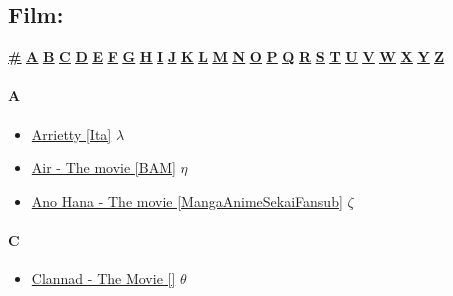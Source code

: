 \subsection [Film]{\huge Film:}
		\begin{center}
			\hyperlink{F\#}{\textbf{\underline{\#}}}
			\hyperlink{FA}{\textbf{\underline{A}}} \hyperlink{FB}{\textbf{\underline{B}}} \hyperlink{FC}{\textbf{\underline{C}}} \hyperlink{FD}{\textbf{\underline{D}}} \hyperlink{FE}{\textbf{\underline{E}}} \hyperlink{FF}{\textbf{\underline{F}}} \hyperlink{FG}{\textbf{\underline{G}}} \hyperlink{FH}{\textbf{\underline{H}}} \hyperlink{FI}{\textbf{\underline{I}}} \hyperlink{FJ}{\textbf{\underline{J}}} \hyperlink{FK}{\textbf{\underline{K}}} \hyperlink{FL}{\textbf{\underline{L}}} \hyperlink{FM}{\textbf{\underline{M}}} \hyperlink{FN}{\textbf{\underline{N}}} \hyperlink{FO}{\textbf{\underline{O}}} \hyperlink{FP}{\textbf{\underline{P}}} \hyperlink{FQ}{\textbf{\underline{Q}}} \hyperlink{FR}{\textbf{\underline{R}}} \hyperlink{FS}{\textbf{\underline{S}}} \hyperlink{FT}{\textbf{\underline{T}}} \hyperlink{FU}{\textbf{\underline{U}}} \hyperlink{FV}{\textbf{\underline{V}}} \hyperlink{FW}{\textbf{\underline{W}}} \hyperlink{FX}{\textbf{\underline{X}}} \hyperlink{FY}{\textbf{\underline{Y}}} \hyperlink{FZ}{\textbf{\underline{Z}}}
		\end{center}	
			
		\paragraph{A} \hypertarget{FA}{}
			\begin{itemize}
				
				\item \href{https://mega.nz/#!X9xTTIba!VAhOn8RGaHEn9gn3zieIKvrSqfGuvjP32t7Tp60wj8w} {Arrietty [Ita]}  $\lambda$   \\
				\item \href{https://mega.nz/#!1BEAhLAZ!x_gNUHZTHh-ZMZxaVgmaZFKARZTPHwh7ebcBH49oFnc} {Air - The movie [BAM]}  $\eta$   \\
				\item \href{https://mega.nz/#!PgkBXLgZ!WKtvjldKy8Tng40FARM2Qino6FgQQvHTZaV4XRLf8ak} {Ano Hana - The movie [MangaAnimeSekaiFansub]}  $\zeta$   \\
			
			\end{itemize}
		
		\paragraph{C} \hypertarget{FC}{}
			\begin{itemize}
			
				\item \href{https://mega.nz/#!EtFnEZLA!CN6D4a9E4_qmCqwAPVuNz1TstdnwcVk8el7LcXgEV_Y} {Clannad - The Movie []}  $\theta$   \\
			
			\end{itemize}
		
